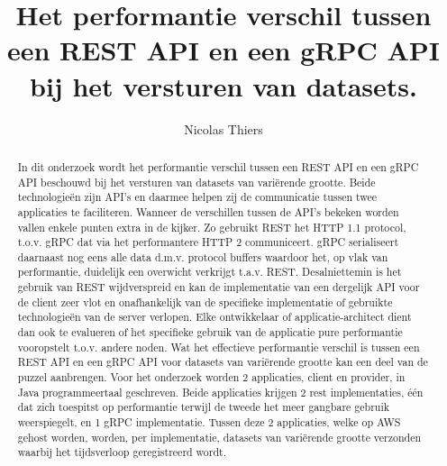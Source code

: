 \documentclass{hogent-article}
\title{Het performantie verschil tussen een REST API en een gRPC API bij het versturen van datasets.}
\author{Nicolas Thiers}
\begin{document}
\begin{abstract}
  In dit onderzoek wordt het performantie verschil tussen een REST API en een gRPC API beschouwd bij het versturen van datasets van variërende grootte.
  Beide technologieën zijn API's en daarmee helpen zij de communicatie tussen twee applicaties te faciliteren.
  Wanneer de verschillen tussen de API's bekeken worden vallen enkele punten extra in de kijker.
  Zo gebruikt REST het HTTP 1.1 protocol, t.o.v. gRPC dat via het performantere HTTP 2 communiceert.
  gRPC serialiseert daarnaast nog eens alle data d.m.v. protocol buffers waardoor het, op vlak van performantie, duidelijk een overwicht verkrijgt t.a.v. REST.
  Desalniettemin is het gebruik van REST wijdverspreid en kan de implementatie van een dergelijk API voor de client zeer vlot en onafhankelijk van de specifieke
  implementatie of gebruikte technologieën van de server verlopen. Elke ontwikkelaar of applicatie-architect dient dan ook te evalueren of het specifieke gebruik
  van de applicatie pure performantie vooropstelt t.o.v. andere noden. Wat het effectieve performantie verschil is tussen een REST API en een gRPC API voor
  datasets van variërende grootte kan een deel van de puzzel aanbrengen.
  Voor het onderzoek worden 2 applicaties, client en provider, in Java programmeertaal geschreven.
  Beide applicaties krijgen 2 rest implementaties, één dat zich toespitst op performantie terwijl de tweede het meer gangbare gebruik weerspiegelt,
  en 1 gRPC implementatie. Tussen deze 2 applicaties, welke op AWS gehost worden, worden, per implementatie, datasets van variërende grootte
  verzonden waarbij het tijdsverloop geregistreerd wordt.
\end{abstract}

\tableofcontents



\printbibliography[heading=bibintoc]
\end{document}
